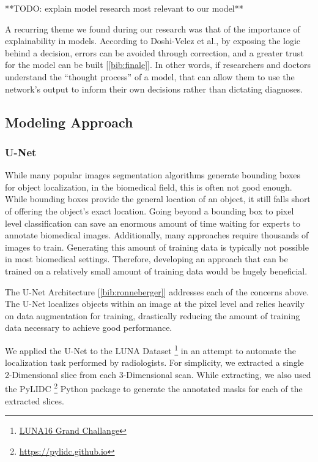 \documentclass[12pt]{article}
\begin{document}
{**TODO: explain model research most relevant to our model**

A recurring theme we found during our research was that of the importance of explainability in models. According to Doshi-Velez et al., by exposing the logic behind a decision, errors can be avoided through correction, and a greater trust for the model can be built [\ref{bib:finale}]. In other words, if researchers and doctors understand the ``thought process'' of a model,  that can allow them to use the network's output to inform their own decisions rather than dictating diagnoses. 

\subsection*{Modeling Approach}

\subsubsection*{U-Net}
While many popular images segmentation algorithms generate bounding boxes for object localization, in the biomedical field, this is often not good enough. While bounding boxes provide the general location of an object, it still falls short of offering the object's exact location. Going beyond a bounding box to pixel level classification can save an enormous amount of time waiting for experts to annotate biomedical images. Additionally, many approaches require thousands of images to train. Generating this amount of training data is typically not possible in most biomedical settings. Therefore, developing an approach that can be trained on a relatively small amount of training data would be hugely beneficial.  

The U-Net Architecture [\ref{bib:ronneberger}] addresses each of the concerns above. The U-Net localizes objects within an image at the pixel level and relies heavily on data augmentation for training, drastically reducing the amount of training data necessary to achieve good performance.  

We applied the U-Net to the LUNA Dataset \footnote{\href{http://luna16.grand-challenge.org}{LUNA16 Grand Challange}} in an attempt to automate the localization task performed by radiologists. For simplicity, we extracted a single 2-Dimensional slice from each 3-Dimensional scan. While extracting, we also used the PyLIDC \footnote{\href{https://pylidc.github.io}{https://pylidc.github.io}} Python package to generate the annotated masks for each of the extracted slices.

}
\end{document}
